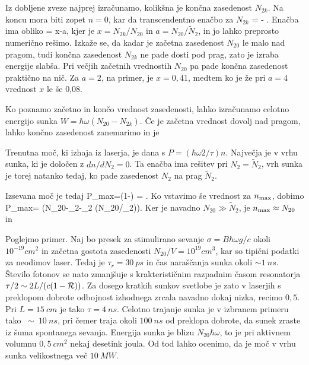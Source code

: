 Iz dobljene zveze najprej izračunamo, kolikšna je končna zasedenost $N_{2k}$. Na
koncu mora biti zopet $n=0$, kar da transcendentno enačbo za $N_{2k}$
\beq
\ln {} = - .
\eeq
Enačba ima obliko
\beq
\ln {}= x-a,
\eeq
kjer je $x=N_{2k}/N_{20}$ in $a=N_{20}/\tilde{N}_{2}$, in jo lahko preprosto
numerično rešimo. Izkaže se, da kadar je začetna zasedenost $N_{20}$
le malo nad pragom, tudi končna zasedenost $N_{2k}$ ne pade dosti pod prag, 
zato je izraba energije slabša. Pri večjih začetnih vrednostih $N_{20}$ pa 
pade končna zasedenost praktično na nič. Za $a=2$, na primer,
je $x=0,41$, medtem ko je že pri $a=4$ vrednost $x$ le še 0,08. 

Ko poznamo začetno in končo vrednost zasedenosti, lahko izračunamo 
celotno energijo sunka $W=\hbar \omega (N_{20}-N_{2k})$. Če je začetna vrednost
dovolj nad pragom, lahko končno zasedenost zanemarimo in je 

Trenutna moč, ki izhaja iz laserja, je dana s $P=(\hbar \omega 2/\tau )n$.
Največja je v vrhu sunka, ki je določen z $dn/dN_{2}=0$. Ta enačba ima
rešitev pri $N_{2}=\tilde{N}_{2}$, vrh sunka je torej natanko tedaj, ko
pade zasedenost $N_2$ na prag $\tilde{N}_2$. 

Izsevana moč je tedaj 
\beq
P_{\rm max}=\left(1-\right) = 
.
\eeq
Ko vstavimo še vrednost za $n_{\rm max}$, dobimo
\beq
P_{\rm max}=\frac {2\hbar \omega}{\tau} \left(N_{20}-_{2}-_{2}
\ln (N_{20}/_{2})\right).
\eeq
Ker je navadno $N_{20}\gg \tilde{N}_2$, je $n_{\rm max} \approx N_{20}$
in 

Poglejmo primer. Naj bo presek za stimulirano sevanje $\sigma=B\hbar \omega g/c$ 
okoli $10^{-19}\si{cm}^{2}$ in začetna gostota zasedenosti $N_{20}/V=10^{19}\si{cm}^3$,
kar so tipični podatki za neodimov laser. Tedaj je $\tau_{r}=30~\si{ps}$ in čas naraščanja
sunka okoli $\sim 1~\si{ns}$. Število fotonov se nato zmanjšuje s
krakterističnim razpadnim časom resonatorja $\tau /2\sim 2L/(c(1-{\cal R}))$. 
Za dosego kratkih sunkov svetlobe je zato v laserjih s preklopom dobrote odbojnost 
izhodnega zrcala navadno dokaj nizka, recimo $0,5$. Pri $L=15~\si{cm}$ je tako $\tau=4~\si{ns}$.
Celotno trajanje sunka je v izbranem primeru tako $~\sim~10~\si{ns}$, pri
čemer traja okoli $100~\si{ns}$ od preklopa dobrote, da sunek zraste iz šuma
spontanega sevanja. Energija sunka je blizu $N_{20}\hbar \omega $, to je pri
aktivnem volumnu $0,5~\si{cm}^2$ nekaj desetink joula. Od tod lahko ocenimo, da je
moč v vrhu sunka velikostnega več $10~\si{MW}$.

